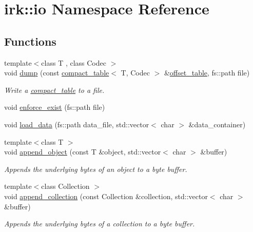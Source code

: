 \hypertarget{namespaceirk_1_1io}{}\section{irk\+:\+:io Namespace Reference}
\label{namespaceirk_1_1io}
\subsection*{Functions}
\begin{DoxyCompactItemize}
\item 
{\footnotesize template$<$class T , class Codec $>$ }\\void \mbox{\hyperlink{namespaceirk_1_1io_a7eb5e1bc8d97d131311b0054a1b79b94}{dump}} (const \mbox{\hyperlink{classirk_1_1compact__table}{compact\+\_\+table}}$<$ T, Codec $>$ \&\mbox{\hyperlink{classirk_1_1offset__table}{offset\+\_\+table}}, fs\+::path file)
\begin{DoxyCompactList}\small\item\em Write a {\ttfamily \mbox{\hyperlink{classirk_1_1compact__table}{compact\+\_\+table}}} to a file. \end{DoxyCompactList}\item 
void \mbox{\hyperlink{namespaceirk_1_1io_aae2b76d3f044ad43f8b25e08a142285f}{enforce\+\_\+exist}} (fs\+::path file)
\item 
void \mbox{\hyperlink{namespaceirk_1_1io_aa680509002f530048131492dea584724}{load\+\_\+data}} (fs\+::path data\+\_\+file, std\+::vector$<$ char $>$ \&data\+\_\+container)
\item 
{\footnotesize template$<$class T $>$ }\\void \mbox{\hyperlink{namespaceirk_1_1io_a6b56c2c88f08eba5647f662fe701be3c}{append\+\_\+object}} (const T \&object, std\+::vector$<$ char $>$ \&buffer)
\begin{DoxyCompactList}\small\item\em Appends the underlying bytes of an object to a byte buffer. \end{DoxyCompactList}\item 
{\footnotesize template$<$class Collection $>$ }\\void \mbox{\hyperlink{namespaceirk_1_1io_ae89e77960d5da14cd0068835eaa3a442}{append\+\_\+collection}} (const Collection \&collection, std\+::vector$<$ char $>$ \&buffer)
\begin{DoxyCompactList}\small\item\em Appends the underlying bytes of a collection to a byte buffer. \end{DoxyCompactList}\end{DoxyCompactItemize}


